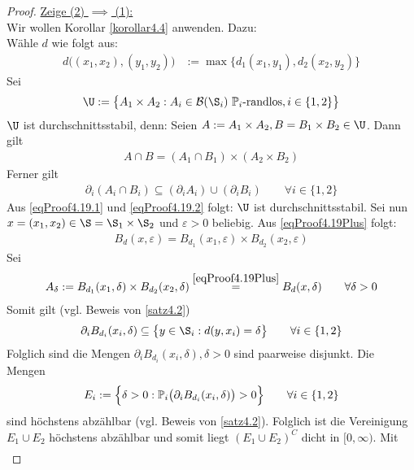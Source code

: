 \begin{proof}
\underline{Zeige (2) $\implies$ (1):}\\
Wir wollen Korollar \ref{korollar4.4} anwenden. Dazu:\\
Wähle $d$ wie folgt aus:
\begin{align}\label{eqProof4.19Plus}\tag{+}
d\big((x_1,x_2),(y_1,y_2)\big)&:=\max\big\lbrace d_1(x_1,y_1),d_2(x_2,y_2)\big\rbrace
\end{align}
Sei
\begin{align*}
\U:=\big\lbrace A_1\times A_2:A_i\in\B(\S_i)~\P_i\text{-randlos}, i\in\lbrace1,2\rbrace\big\rbrace 
\end{align*}
$\U$ ist durchschnittsstabil, denn: Seien $A:=A_1\times A_2,B=B_1\times B_2\in\U$. Dann gilt
\begin{align}\label{eqProof4.19.1}\tag{1}
A\cap B=(A_1\cap B_1)\times(A_2\times B_2)
\end{align}
Ferner gilt
\begin{align}\label{eqProof4.19.2}\tag{2}
\partial_i(A_i\cap B_i)\subseteq(\partial_i A_i)\cup(\partial_i B_i)\qquad\forall i\in\lbrace1,2\rbrace
\end{align}
Aus \eqref{eqProof4.19.1} und \eqref{eqProof4.19.2} folgt: $\U$ ist durchschnittsstabil. Sei nun $x=(x_1,x_2)\in\S=\S_1\times\S_2$ und $\varepsilon>0$ beliebig. Aus \eqref{eqProof4.19Plus} folgt:
\begin{align*}
B_d(x,\varepsilon)=B_{d_1}(x_1,\varepsilon)\times B_{d_2}(x_2,\varepsilon)
\end{align*}
Sei 
\begin{align*}
A_\delta:=B_{d_1}(x_1,\delta)\times B_{d_2}(x_2,\delta)
\stackeq{\eqref{eqProof4.19Plus}} B_d(x,\delta)\qquad\forall\delta>0
\end{align*}
Somit gilt (vgl. Beweis von \ref{satz4.2})
\begin{align*}
\partial_i B_{d_i}(x_i,\delta)\subseteq\big\lbrace y\in\S_i:d(y,x_i)=\delta\big\rbrace\qquad\forall i\in\lbrace1,2\rbrace
\end{align*}
Folglich sind die Mengen $\partial_i B_{d_i}(x_i,\delta),\delta>0$ sind paarweise disjunkt. Die Mengen
\begin{align*}
E_i:=\Big\lbrace\delta>0:\P_i\big(\partial_i B_{d_i}(x_i,\delta)\big)>0\Big\rbrace\qquad\forall i\in\lbrace1,2\rbrace
\end{align*}
sind höchstens abzählbar (vgl. Beweis von \ref{satz4.2}). Folglich ist die Vereinigung $E_1\cup E_2$ höchstens abzählbar und somit liegt $(E_1\cup E_2)^C$ dicht in $[0,\infty)$. Mit
\begin{align*}

\end{align*}
\end{proof}

